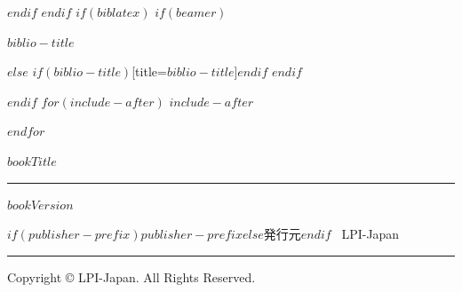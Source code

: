\documentclass[
$if(fontsize)$
  $fontsize$,
$endif$
$if(papersize)$
  $papersize$paper,
$endif$
$if(beamer)$
  ignorenonframetext,
$if(handout)$
  handout,
$endif$
$if(aspectratio)$
  aspectratio=$aspectratio$,
$endif$
$endif$
$for(classoption)$
  $classoption$$sep$,
$endfor$
]{$documentclass$}
\newif\ifbibliography
\begin{document}
$endif$
$endif$
$if(biblatex)$
$if(beamer)$
\begin{frame}[allowframebreaks]{$biblio-title$}
  \bibliographytrue
  \printbibliography[heading=none]
\end{frame}
$else$
\printbibliography$if(biblio-title)$[title=$biblio-title$]$endif$
$endif$

$endif$
$for(include-after)$
$include-after$

$endfor$
\newpage
\thispagestyle{empty}
  \vspace*{\fill}
  {\LARGE\linespread{1.2}\selectfont $bookTitle$\par}

  \rule{\textwidth}{0.5pt}

  $bookVersion$

  $if(publisher-prefix)$$publisher-prefix$$else$発行元$endif$ \, LPI-Japan

  \rule{\textwidth}{0.5pt}

  Copyright \copyright{} LPI-Japan. All Rights Reserved.

  \vspace*{1cm}
\end{document}

